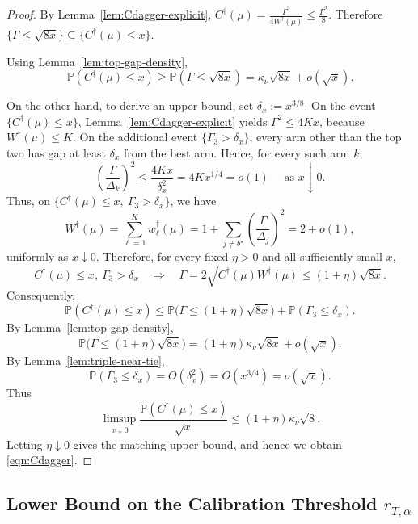 \documentclass[10pt]{article}
\theoremstyle{plain}
\begin{document}
\begin{proof}
By Lemma~\ref{lem:Cdagger-explicit},
$C^\dagger(\mu)
=
\frac{\Gamma^2}{4W^\dagger(\mu)}
\le
\frac{\Gamma^2}{8}$.
Therefore
$\{\Gamma\le \sqrt{8x}\}
\subseteq
\{C^\dagger(\mu)\le x\}$.

Using Lemma~\ref{lem:top-gap-density},
\[
\mathbb P(C^\dagger(\mu)\le x)
\ge
\mathbb P(\Gamma\le \sqrt{8x})
=
\kappa_\nu\sqrt{8x}+o(\sqrt x).
\] 

\noindent On the other hand, to derive an upper bound, set
$\delta_x:=x^{3/8}$.
On the event $\{C^\dagger(\mu)\le x\}$, Lemma~\ref{lem:Cdagger-explicit} yields
$\Gamma^2\le 4Kx$,
because $W^\dagger(\mu)\le K$.
On the additional event $\{\Gamma_3>\delta_x\}$, every arm other than the top two
has gap at least $\delta_x$ from the best arm. Hence, for every such arm $k$,
\[
\left(\frac{\Gamma}{\Delta_k}\right)^2
\le
\frac{4Kx}{\delta_x^2}
=
4Kx^{1/4}
=o(1)\quad \text{ as } x \downarrow 0.
\]
Thus, on
$\{C^\dagger(\mu)\le x,\ \Gamma_3>\delta_x\}$,
we have
\[
W^\dagger(\mu)
=\sum_{\ell=1}^K w_\ell^\dagger(\mu)
=
1+\sum_{j\neq b^\star}
\left(
\frac{\Gamma}{\Delta_j}
\right)^2=
2+o(1),
\]
uniformly as $x\downarrow0$. Therefore, for every fixed $\eta>0$ and all
sufficiently small $x$,
\[
C^\dagger(\mu)\le x,\ \Gamma_3>\delta_x
\quad\Longrightarrow\quad
\Gamma = 2 \sqrt{C^\dagger(\mu) W^\dagger(\mu)}
\le
(1+\eta)\sqrt{8x}.
\]
Consequently,
\[
\mathbb P(C^\dagger(\mu)\le x)
\le
\mathbb P\bigl(\Gamma\le(1+\eta)\sqrt{8x}\bigr)
+
\mathbb P(\Gamma_3\le\delta_x).
\]
By Lemma~\ref{lem:top-gap-density},
\[
\mathbb P\bigl(\Gamma\le(1+\eta)\sqrt{8x}\bigr)
=
(1+\eta)\kappa_\nu\sqrt{8x}+o(\sqrt x).
\]
By Lemma~\ref{lem:triple-near-tie},
\[
\mathbb P(\Gamma_3\le\delta_x)
=
O(\delta_x^2)
=
O(x^{3/4})
=
o(\sqrt x).
\]
Thus
\[
\limsup_{x\downarrow0}
\frac{\mathbb P(C^\dagger(\mu)\le x)}{\sqrt x}
\le
(1+\eta)\kappa_\nu\sqrt8.
\]
Letting $\eta\downarrow0$ gives the matching upper bound, and hence we obtain \eqref{eqn:Cdagger}.  
\end{proof}



\subsection{Lower Bound on the Calibration Threshold $r_{T,\alpha}$}
\end{document}
